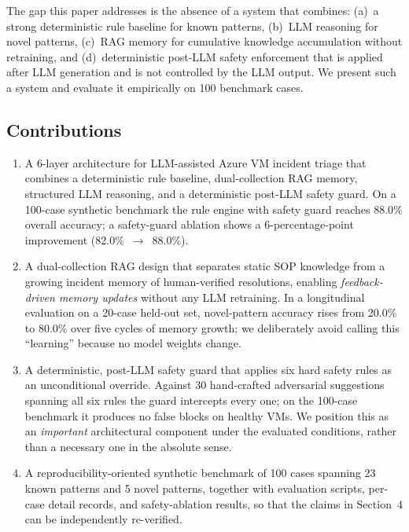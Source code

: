 \documentclass[a4paper,10pt,journal,compsoc]{IEEEtran}
\begin{document}
The gap this paper addresses is the absence of a system that combines:
(a)~a strong deterministic rule baseline for known patterns,
(b)~LLM reasoning for novel patterns,
(c)~RAG memory for cumulative knowledge accumulation without
retraining, and
(d)~deterministic post-LLM safety enforcement that is applied after
LLM generation and is not controlled by the LLM output. We present
such a system and evaluate it empirically
on 100 benchmark cases.

\subsection{Contributions}

\begin{enumerate}
\item A 6-layer architecture for LLM-assisted Azure VM incident triage
  that combines a deterministic rule baseline, dual-collection RAG
  memory, structured LLM reasoning, and a deterministic post-LLM safety
  guard. On a 100-case synthetic benchmark the rule engine with safety
  guard reaches 88.0\% overall accuracy; a safety-guard ablation shows
  a 6-percentage-point improvement (82.0\%~$\to$~88.0\%).
\item A dual-collection RAG design that separates static SOP knowledge
  from a growing incident memory of human-verified resolutions, enabling
  \emph{feedback-driven memory updates} without any LLM retraining. In
  a longitudinal evaluation on a 20-case held-out set, novel-pattern
  accuracy rises from 20.0\% to 80.0\% over five cycles of memory
  growth; we deliberately avoid calling this ``learning'' because no
  model weights change.
\item A deterministic, post-LLM safety guard that applies six hard
  safety rules as an unconditional override. Against 30 hand-crafted
  adversarial suggestions spanning all six rules the guard intercepts
  every one; on the 100-case benchmark it produces no false blocks on
  healthy VMs. We position this as an \emph{important} architectural
  component under the evaluated conditions, rather than a necessary one
  in the absolute sense.
\item A reproducibility-oriented synthetic benchmark of 100 cases spanning 23
  known patterns and 5 novel patterns, together with evaluation scripts,
  per-case detail records, and safety-ablation results, so that the
  claims in Section~4 can be independently re-verified.
\end{enumerate}
\end{document}
